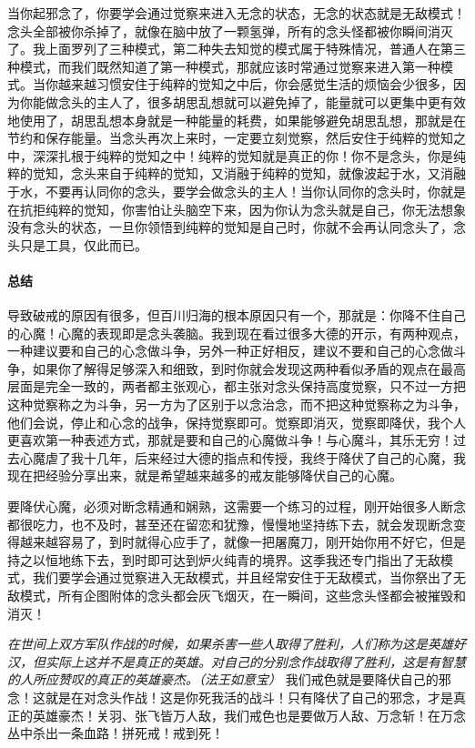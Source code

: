当你起邪念了，你要学会通过觉察来进入无念的状态，无念的状态就是无敌模式！念头全部被你杀掉了，就像在脑中放了一颗氢弹，所有的念头怪都被你瞬间消灭了。我上面罗列了三种模式，第二种失去知觉的模式属于特殊情况，普通人在第三种模式，而我们既然知道了第一种模式，那就应该时常通过觉察来进入第一种模式。当你越来越习惯安住于纯粹的觉知之中后，你会感觉生活的烦恼会少很多，因为你能做念头的主人了，很多胡思乱想就可以避免掉了，能量就可以更集中更有效地使用了，胡思乱想本身就是一种能量的耗费，如果能够避免胡思乱想，那就是在节约和保存能量。当念头再次上来时，一定要立刻觉察，然后安住于纯粹的觉知之中，深深扎根于纯粹的觉知之中！纯粹的觉知就是真正的你！你不是念头，你是纯粹的觉知，念头来自于纯粹的觉知，又消融于纯粹的觉知，就像波起于水，又消融于水，不要再认同你的念头，要学会做念头的主人！当你认同你的念头时，你就是在抗拒纯粹的觉知，你害怕让头脑空下来，因为你认为念头就是自己，你无法想象没有念头的状态，一旦你领悟到纯粹的觉知是自己时，你就不会再认同念头了，念头只是工具，仅此而已。

\paragraph*{总结}

导致破戒的原因有很多，但百川归海的根本原因只有一个，那就是：你降不住自己的心魔！心魔的表现即是念头袭脑。我到现在看过很多大德的开示，有两种观点，一种建议要和自己的心念做斗争，另外一种正好相反，建议不要和自己的心念做斗争，如果你了解得足够深入和细致，到时你就会发现这两种看似矛盾的观点在最高层面是完全一致的，两者都主张观心，都主张对念头保持高度觉察，只不过一方把这种觉察称之为斗争，另一方为了区别于以念治念，而不把这种觉察称之为斗争，他们会说，停止和心念的战争，保持觉察即可。觉察即消灭，觉察即降伏，我个人更喜欢第一种表述方式，那就是要和自己的心魔做斗争！与心魔斗，其乐无穷！过去心魔虐了我十几年，后来经过大德的指点和传授，我终于降伏了自己的心魔，我现在把经验分享出来，就是希望越来越多的戒友能够降伏自己的心魔。

要降伏心魔，必须对断念精通和娴熟，这需要一个练习的过程，刚开始很多人断念都很吃力，也不及时，甚至还在留恋和犹豫，慢慢地坚持练下去，就会发现断念变得越来越容易了，到时就得心应手了，就像一把屠魔刀，刚开始你用不好它，但是持之以恒地练下去，到时即可达到炉火纯青的境界。这季我还专门指出了无敌模式，我们要学会通过觉察进入无敌模式，并且经常安住于无敌模式，当你祭出了无敌模式，所有企图附体的念头都会灰飞烟灭，在一瞬间，这些念头怪都会被摧毁和消灭！

\textit{在世间上双方军队作战的时候，如果杀害一些人取得了胜利，人们称为这是英雄好汉，但实际上这并不是真正的英雄。对自己的分别念作战取得了胜利，这是有智慧的人所应赞叹的真正的英雄豪杰。（法王如意宝）} 我们戒色就是要降伏自己的邪念！这就是在对念头作战！这是你死我活的战斗！只有降伏了自己的邪念，才是真正的英雄豪杰！关羽、张飞皆万人敌，我们戒色也是要做万人敌、万念斩！在万念丛中杀出一条血路！拼死戒！戒到死！

